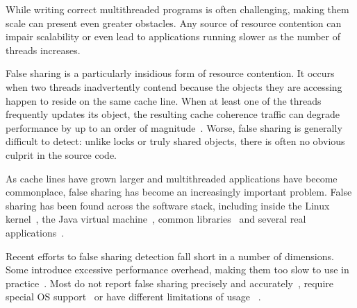 
\label{sec:intro} 

While writing correct multithreaded programs is often challenging,
making them scale can present even greater obstacles. Any source of
resource contention can impair scalability or even lead to
applications running slower as the number of threads increases.

False sharing is a particularly insidious form of resource contention.
It occurs when two threads inadvertently contend because the objects
they are accessing happen to reside on the same cache line. When at least
one of the threads frequently updates its object, the resulting cache
coherence traffic can degrade performance by up to an order of
magnitude~\cite{falseshareeffect}. Worse, false sharing is generally
difficult to detect: unlike locks or truly shared objects, there is
often no obvious culprit in the source code.

As cache lines have grown larger and multithreaded applications have
become commonplace, false sharing has become an increasingly important
problem. False sharing has been found across the software stack,
including inside the Linux kernel~\cite{OSfalsesharing}, the Java
virtual machine~\cite{JVMfalsesharing}, common
libraries~\cite{libfalsesharing} and several real
applications~\cite{appfalsesharing, mysql}.

Recent efforts to false sharing detection fall short in a number of
dimensions. Some introduce excessive performance overhead, making them
too slow to use in practice~\cite{falseshare:simulator,
falseshare:binaryinstrumentation1,falseshare:binaryinstrumentation2}. Most
do not report false sharing precisely and
accurately~\cite{qinzhaodetection, detect:ptu, detect:intel,
falseshare:binaryinstrumentation1, DProf,
falseshare:binaryinstrumentation2}, require special OS
support~\cite{OSdetection} or have different limitations of usage~\cite{sheriff} .

